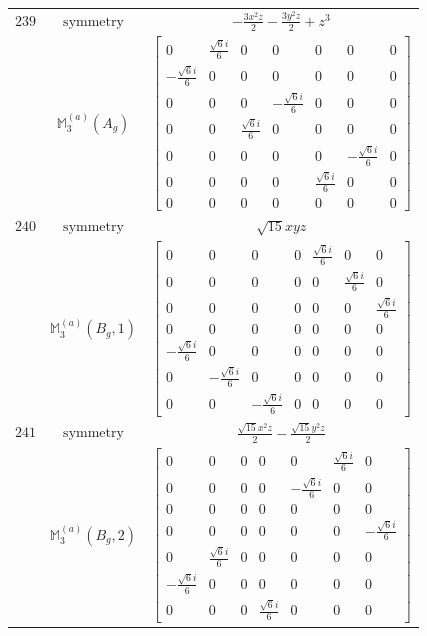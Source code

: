 \documentclass[fleqn,8pt,landscape]{jsarticle}
\begin{document}
\begin{longtable}{ccc}
$ 239 $ & $ \text{symmetry} $ & $ - \frac{3 x^{2} z}{2} - \frac{3 y^{2} z}{2} + z^{3} $ \\
$  $ & $ \mathbb{M}_{3}^{(a)}(A_{g}) $ & $ \begin{bmatrix} 0 & \frac{\sqrt{6} i}{6} & 0 & 0 & 0 & 0 & 0 \\ - \frac{\sqrt{6} i}{6} & 0 & 0 & 0 & 0 & 0 & 0 \\ 0 & 0 & 0 & - \frac{\sqrt{6} i}{6} & 0 & 0 & 0 \\ 0 & 0 & \frac{\sqrt{6} i}{6} & 0 & 0 & 0 & 0 \\ 0 & 0 & 0 & 0 & 0 & - \frac{\sqrt{6} i}{6} & 0 \\ 0 & 0 & 0 & 0 & \frac{\sqrt{6} i}{6} & 0 & 0 \\ 0 & 0 & 0 & 0 & 0 & 0 & 0 \end{bmatrix} $ \\ \hline
$ 240 $ & $ \text{symmetry} $ & $ \sqrt{15} x y z $ \\
$  $ & $ \mathbb{M}_{3}^{(a)}(B_{g},1) $ & $ \begin{bmatrix} 0 & 0 & 0 & 0 & \frac{\sqrt{6} i}{6} & 0 & 0 \\ 0 & 0 & 0 & 0 & 0 & \frac{\sqrt{6} i}{6} & 0 \\ 0 & 0 & 0 & 0 & 0 & 0 & \frac{\sqrt{6} i}{6} \\ 0 & 0 & 0 & 0 & 0 & 0 & 0 \\ - \frac{\sqrt{6} i}{6} & 0 & 0 & 0 & 0 & 0 & 0 \\ 0 & - \frac{\sqrt{6} i}{6} & 0 & 0 & 0 & 0 & 0 \\ 0 & 0 & - \frac{\sqrt{6} i}{6} & 0 & 0 & 0 & 0 \end{bmatrix} $ \\ \hline
$ 241 $ & $ \text{symmetry} $ & $ \frac{\sqrt{15} x^{2} z}{2} - \frac{\sqrt{15} y^{2} z}{2} $ \\
$  $ & $ \mathbb{M}_{3}^{(a)}(B_{g},2) $ & $ \begin{bmatrix} 0 & 0 & 0 & 0 & 0 & \frac{\sqrt{6} i}{6} & 0 \\ 0 & 0 & 0 & 0 & - \frac{\sqrt{6} i}{6} & 0 & 0 \\ 0 & 0 & 0 & 0 & 0 & 0 & 0 \\ 0 & 0 & 0 & 0 & 0 & 0 & - \frac{\sqrt{6} i}{6} \\ 0 & \frac{\sqrt{6} i}{6} & 0 & 0 & 0 & 0 & 0 \\ - \frac{\sqrt{6} i}{6} & 0 & 0 & 0 & 0 & 0 & 0 \\ 0 & 0 & 0 & \frac{\sqrt{6} i}{6} & 0 & 0 & 0 \end{bmatrix} $ \\ \hline

\end{longtable}
\end{document}
